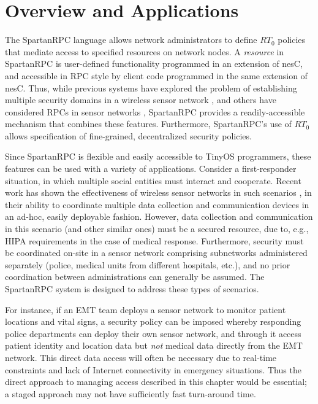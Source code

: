 \section{Overview and Applications}
\label{section-overview}

The SpartanRPC language allows network administrators to define $RT_0$ policies that mediate
access to specified resources on network nodes. A \emph{resource} in SpartanRPC is user-defined
functionality programmed in an extension of nesC, and accessible in RPC style by client code
programmed in the same extension of nesC. Thus, while previous systems have explored the problem
of establishing multiple security domains in a wireless sensor network
\cite{Claycomb:2011:NNL:1889383.1889450}, and others have considered RPCs in sensor networks
\cite{may-tinyrpc-2007,bergstrom-anycastrpc-2007,5766863}, SpartanRPC provides a
readily-accessible mechanism that combines these features. Furthermore, SpartanRPC's use of
$RT_0$ allows specification of fine-grained, decentralized security policies.

Since SpartanRPC is flexible and easily accessible to TinyOS programmers, these features can be
used with a variety of applications. Consider a first-responder situation, in which multiple
social entities must interact and cooperate. Recent work has shown the effectiveness of wireless
sensor networks in such scenarios \cite{citeulike:4460555,1038146}, in their ability to
coordinate multiple data collection and communication devices in an ad-hoc, easily deployable
fashion. However, data collection and communication in this scenario (and other similar ones)
must be a secured resource, due to, e.g., HIPA requirements in the case of medical response.
Furthermore, security must be coordinated on-site in a sensor network comprising subnetworks
administered separately (police, medical units from different hospitals, etc.), and no prior
coordination between administrations can generally be assumed. The SpartanRPC system is designed
to address these types of scenarios.

For instance, if an EMT team deploys a sensor network to monitor patient locations and vital
signs, a security policy can be imposed whereby responding police departments can deploy their
own sensor network, and through it access patient identity and location data but \emph{not}
medical data directly from the EMT network. This direct data access will often be necessary due
to real-time constraints and lack of Internet connectivity in emergency situations. Thus the
direct approach to managing access described in this chapter would be essential; a staged
approach may not have sufficiently fast turn-around time.


